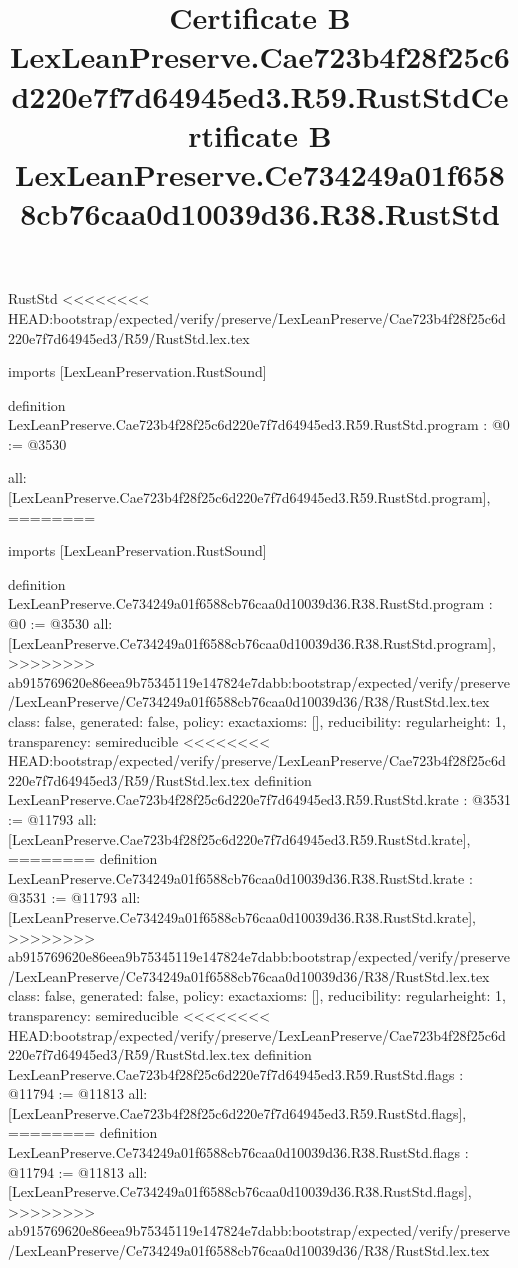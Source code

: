 \begin{lexlean}{RustStd}
<<<<<<<< HEAD:bootstrap/expected/verify/preserve/LexLeanPreserve/Cae723b4f28f25c6d220e7f7d64945ed3/R59/RustStd.lex.tex
\title{Certificate B LexLeanPreserve.Cae723b4f28f25c6d220e7f7d64945ed3.R59.RustStd}
\begin{coremodule}
imports [LexLeanPreservation.RustSound]

definition LexLeanPreserve.Cae723b4f28f25c6d220e7f7d64945ed3.R59.RustStd.program : @0 := @3530 {
  all: [LexLeanPreserve.Cae723b4f28f25c6d220e7f7d64945ed3.R59.RustStd.program],
========
\title{Certificate B LexLeanPreserve.Ce734249a01f6588cb76caa0d10039d36.R38.RustStd}
\begin{coremodule}
imports [LexLeanPreservation.RustSound]

definition LexLeanPreserve.Ce734249a01f6588cb76caa0d10039d36.R38.RustStd.program : @0 := @3530 {
  all: [LexLeanPreserve.Ce734249a01f6588cb76caa0d10039d36.R38.RustStd.program],
>>>>>>>> ab915769620e86eea9b75345119e147824e7dabb:bootstrap/expected/verify/preserve/LexLeanPreserve/Ce734249a01f6588cb76caa0d10039d36/R38/RustStd.lex.tex
  class: false,
  generated: false,
  policy: exact{axioms: []},
  reducibility: regular{height: 1},
  transparency: semireducible
}
<<<<<<<< HEAD:bootstrap/expected/verify/preserve/LexLeanPreserve/Cae723b4f28f25c6d220e7f7d64945ed3/R59/RustStd.lex.tex
definition LexLeanPreserve.Cae723b4f28f25c6d220e7f7d64945ed3.R59.RustStd.krate : @3531 := @11793 {
  all: [LexLeanPreserve.Cae723b4f28f25c6d220e7f7d64945ed3.R59.RustStd.krate],
========
definition LexLeanPreserve.Ce734249a01f6588cb76caa0d10039d36.R38.RustStd.krate : @3531 := @11793 {
  all: [LexLeanPreserve.Ce734249a01f6588cb76caa0d10039d36.R38.RustStd.krate],
>>>>>>>> ab915769620e86eea9b75345119e147824e7dabb:bootstrap/expected/verify/preserve/LexLeanPreserve/Ce734249a01f6588cb76caa0d10039d36/R38/RustStd.lex.tex
  class: false,
  generated: false,
  policy: exact{axioms: []},
  reducibility: regular{height: 1},
  transparency: semireducible
}
<<<<<<<< HEAD:bootstrap/expected/verify/preserve/LexLeanPreserve/Cae723b4f28f25c6d220e7f7d64945ed3/R59/RustStd.lex.tex
definition LexLeanPreserve.Cae723b4f28f25c6d220e7f7d64945ed3.R59.RustStd.flags : @11794 := @11813 {
  all: [LexLeanPreserve.Cae723b4f28f25c6d220e7f7d64945ed3.R59.RustStd.flags],
========
definition LexLeanPreserve.Ce734249a01f6588cb76caa0d10039d36.R38.RustStd.flags : @11794 := @11813 {
  all: [LexLeanPreserve.Ce734249a01f6588cb76caa0d10039d36.R38.RustStd.flags],
>>>>>>>> ab915769620e86eea9b75345119e147824e7dabb:bootstrap/expected/verify/preserve/LexLeanPreserve/Ce734249a01f6588cb76caa0d10039d36/R38/RustStd.lex.tex
}}}
\end{coremodule}}
\end{coremodule}
\end{lexlean}
